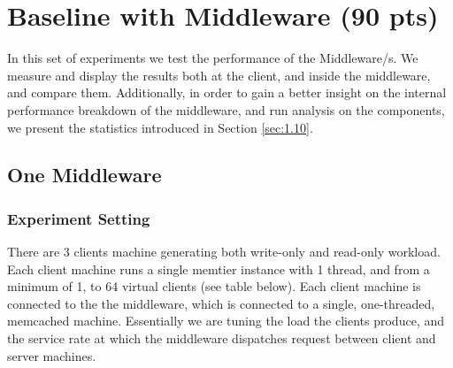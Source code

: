 \documentclass[11pt,a4paper]{article}
\begin{document}
\section{Baseline with Middleware (90 pts)}
\label{sec:3}

In this set of experiments we test the performance of the Middleware/s. 
We measure and display the results both at the client, and inside the middleware, and compare them.
Additionally, in order to gain a better insight on the internal performance breakdown of the middleware, and run analysis on the components, we present the statistics introduced in Section \ref{sec:1.10}.

\subsection{One Middleware}
\label{sec:3.1}

\subsubsection{Experiment Setting}

There are 3 clients machine generating both write-only and read-only workload. Each client machine runs a single memtier instance with 1 thread, and from a minimum of 1, to 64 virtual clients (see table below).
Each client machine is connected to the the middleware, which is connected to a single, one-threaded, memcached machine.
Essentially we are tuning the load the clients produce, and the service rate at which the middleware dispatches request between client and server machines. 
\end{document}
